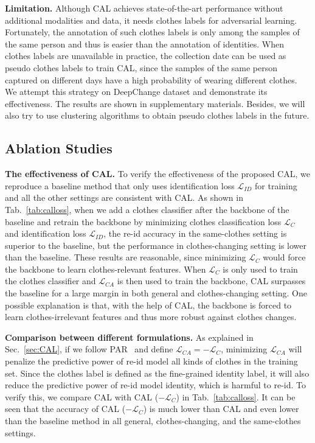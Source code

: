 \documentclass[10pt,twocolumn,letterpaper]{article}
\begin{document}
\medskip
\noindent
\textbf{Limitation.}
Although CAL achieves state-of-the-art performance without additional modalities and data, it needs clothes labels for adversarial learning.
Fortunately, the annotation of such clothes labels is only among the samples of the same person and thus is easier than the annotation of identities.
When clothes labels are unavailable in practice, the collection date can be used as pseudo clothes labels to train CAL, since the samples of the same person captured on different days have a high probability of wearing different clothes. We attempt this strategy on DeepChange dataset and demonstrate its effectiveness.
The results are shown in supplementary materials.
Besides, we will also try to use clustering algorithms to obtain pseudo clothes labels in the future.



\subsection{Ablation Studies}
\label{sec:ablationstudy}

\noindent
\textbf{The effectiveness of CAL.}
To verify the effectiveness of the proposed CAL, we reproduce a baseline method that only uses identification loss $\mathcal{L}_{ID}$ for training and all the other settings are consistent with CAL.
As shown in Tab.~\ref{tab:calloss}, when we add a clothes classifier after the backbone of the baseline and retrain the backbone by minimizing clothes classification loss $\mathcal{L}_{C}$ and identification loss $\mathcal{L}_{ID}$, the re-id accuracy in the same-clothes setting is superior to the baseline, but the performance in clothes-changing setting is lower than the baseline.
These results are reasonable, since minimizing $\mathcal{L}_{C}$ would force the backbone to learn clothes-relevant features.
When $\mathcal{L}_{C}$ is only used to train the clothes classifier and $\mathcal{L}_{CA}$ is then used to train the backbone, CAL surpasses the baseline for a large margin in both general and clothes-changing setting.
One possible explanation is that, with the help of CAL, the backbone is forced to learn clothes-irrelevant features and thus more robust against clothes changes.

\medskip
\noindent
\textbf{Comparison between different formulations.}
As explained in Sec.~\ref{sec:CAL}, if we follow PAR~\cite{Wang2019LearningRobust} and define $\mathcal{L}_{CA}=-\mathcal{L}_{C}$, minimizing $\mathcal{L}_{CA}$ will penalize the predictive power of re-id model \wrt all kinds of clothes in the training set.
Since the clothes label is defined as the fine-grained identity label, it will also reduce the predictive power of re-id model \wrt identity, which is harmful to re-id.
To verify this, we compare CAL with CAL ($-\mathcal{L}_{C}$) in Tab.~\ref{tab:calloss}.
It can be seen that the accuracy of CAL ($-\mathcal{L}_{C}$) is much lower than CAL and even lower than the baseline method in all general, clothes-changing, and the same-clothes settings.
\end{document}
